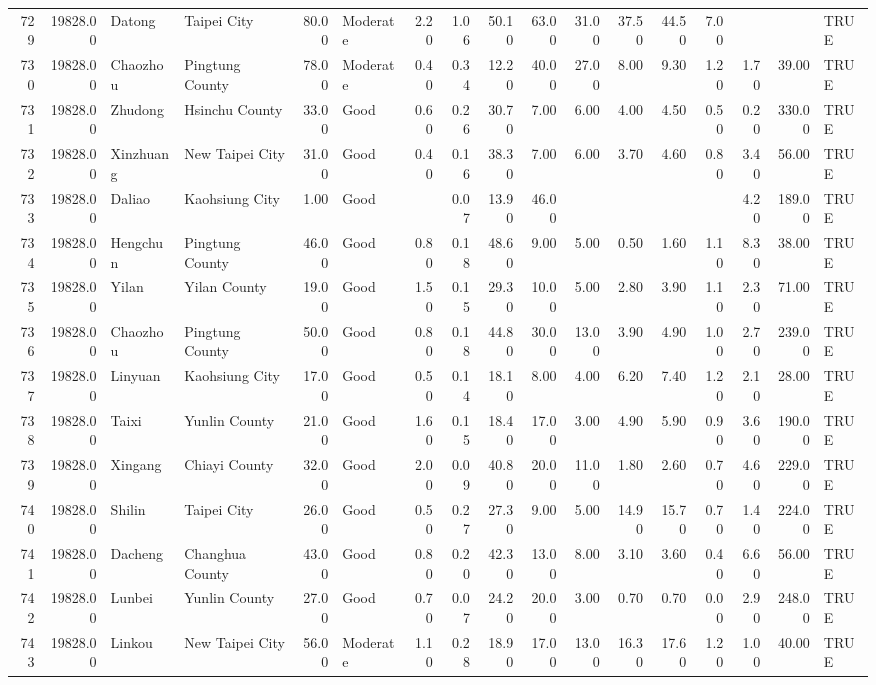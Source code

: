 \begin{table}[ht]
\begin{tabular}{rrllrlrrrrrrrrrrl}
  729 & 19828.00 & Datong & Taipei City & 80.00 & Moderate & 2.20 & 1.06 & 50.10 & 63.00 & 31.00 & 37.50 & 44.50 & 7.00 &  &  & TRUE \\ 
  730 & 19828.00 & Chaozhou & Pingtung County & 78.00 & Moderate & 0.40 & 0.34 & 12.20 & 40.00 & 27.00 & 8.00 & 9.30 & 1.20 & 1.70 & 39.00 & TRUE \\ 
  731 & 19828.00 & Zhudong & Hsinchu County & 33.00 & Good & 0.60 & 0.26 & 30.70 & 7.00 & 6.00 & 4.00 & 4.50 & 0.50 & 0.20 & 330.00 & TRUE \\ 
  732 & 19828.00 & Xinzhuang & New Taipei City & 31.00 & Good & 0.40 & 0.16 & 38.30 & 7.00 & 6.00 & 3.70 & 4.60 & 0.80 & 3.40 & 56.00 & TRUE \\ 
  733 & 19828.00 & Daliao & Kaohsiung City & 1.00 & Good &  & 0.07 & 13.90 & 46.00 &  &  &  &  & 4.20 & 189.00 & TRUE \\ 
  734 & 19828.00 & Hengchun & Pingtung County & 46.00 & Good & 0.80 & 0.18 & 48.60 & 9.00 & 5.00 & 0.50 & 1.60 & 1.10 & 8.30 & 38.00 & TRUE \\ 
  735 & 19828.00 & Yilan & Yilan County & 19.00 & Good & 1.50 & 0.15 & 29.30 & 10.00 & 5.00 & 2.80 & 3.90 & 1.10 & 2.30 & 71.00 & TRUE \\ 
  736 & 19828.00 & Chaozhou & Pingtung County & 50.00 & Good & 0.80 & 0.18 & 44.80 & 30.00 & 13.00 & 3.90 & 4.90 & 1.00 & 2.70 & 239.00 & TRUE \\ 
  737 & 19828.00 & Linyuan & Kaohsiung City & 17.00 & Good & 0.50 & 0.14 & 18.10 & 8.00 & 4.00 & 6.20 & 7.40 & 1.20 & 2.10 & 28.00 & TRUE \\ 
  738 & 19828.00 & Taixi & Yunlin County & 21.00 & Good & 1.60 & 0.15 & 18.40 & 17.00 & 3.00 & 4.90 & 5.90 & 0.90 & 3.60 & 190.00 & TRUE \\ 
  739 & 19828.00 & Xingang & Chiayi County & 32.00 & Good & 2.00 & 0.09 & 40.80 & 20.00 & 11.00 & 1.80 & 2.60 & 0.70 & 4.60 & 229.00 & TRUE \\ 
  740 & 19828.00 & Shilin & Taipei City & 26.00 & Good & 0.50 & 0.27 & 27.30 & 9.00 & 5.00 & 14.90 & 15.70 & 0.70 & 1.40 & 224.00 & TRUE \\ 
  741 & 19828.00 & Dacheng & Changhua County & 43.00 & Good & 0.80 & 0.20 & 42.30 & 13.00 & 8.00 & 3.10 & 3.60 & 0.40 & 6.60 & 56.00 & TRUE \\ 
  742 & 19828.00 & Lunbei & Yunlin County & 27.00 & Good & 0.70 & 0.07 & 24.20 & 20.00 & 3.00 & 0.70 & 0.70 & 0.00 & 2.90 & 248.00 & TRUE \\ 
  743 & 19828.00 & Linkou & New Taipei City & 56.00 & Moderate & 1.10 & 0.28 & 18.90 & 17.00 & 13.00 & 16.30 & 17.60 & 1.20 & 1.00 & 40.00 & TRUE \\ 

\end{tabular}
\end{table}
